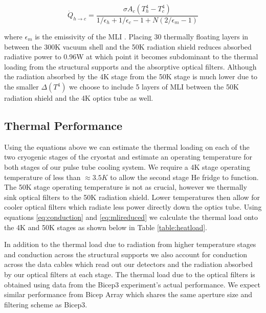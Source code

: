\documentclass[12pt]{article}
\begin{document}
\begin{equation}
	\dot{Q}_{h\rightarrow c}=\frac{\sigma A_c (T_h^4 - T_c ^4)}{1/\epsilon _h
	+ 1/\epsilon _c -1 + N(2/\epsilon _m -1)}
	\label{eq:mlireduced}
\end{equation}

where $\epsilon _m$ is the emissivity of the MLI \cite{cite:Siegel}. Placing 30 thermally
floating layers in between the 300K vacuum shell and the 50K radiation shield
reduces absorbed radiative power to 0.96W at which point it becomes
subdominant to the thermal loading from the structural supports and the
absorptive optical filters. Although the radiation absorbed by the 4K stage
from the 50K stage is much lower due to the smaller $\Delta (T^4)$ we choose
to include 5 layers of MLI between the 50K radiation shield and the 4K optics
tube as well.


\subsection{Thermal Performance}
Using the equations above we can estimate the thermal loading on each of the
two cryogenic stages of the cryostat and estimate an operating temperature for both
stages of our pulse tube cooling system. We require a 4K stage operating
temperature of less than $\approx 3.5K$ to allow the second stage He fridge to
function. The 50K stage operating temperature is not as crucial, however we
thermally sink optical filters to the 50K radiation shield. Lower
temperatures then allow for cooler optical filters which radiate less power
directly down the optics tube. Using equations \ref{eq:conduction} and
\ref{eq:mlireduced} we calculate the thermal load onto the 4K and 50K stages
as shown below in Table \ref{table:heatload}.

In addition to the thermal load due to radiation from higher temperature
stages and conduction across the structural supports we also account for
conduction across the data cables which read out our detectors and the
radiation absorbed by our optical filters at each stage. The thermal load due
to the optical filters is obtained using data from the Bicep3 experiment's
actual performance. We expect similar performance from Bicep Array which
shares the same aperture size and filtering scheme as Bicep3.
\end{document}
